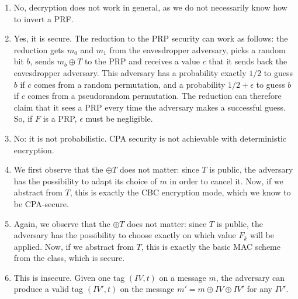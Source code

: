 \begin{solution}
\begin{enumerate}
\item No, decryption does not work in general, as we do not
	necessarily know how to invert a PRF.
	
\item 	Yes, it is secure.  The reduction to the PRP security can work as follows:
	the reduction gets $m_0$ and $m_1$ from the eavesdropper
	adversary, picks a random bit $b$, sends $m_b \oplus T$ to the
	PRP and receives a value $c$ that it sends back the eavesdropper
	adversary. This adversary has a probability exactly $1/2$ to
	guess $b$ if $c$ comes from a random permutation, and a
	probability $1/2 + \epsilon$ to guess $b$ if $c$ comes from a
	pseudorandom permutation. The reduction can therefore claim that
	it sees a PRP every time the adversary makes a successful
	guess. So, if $F$ is a PRP, $\epsilon$ must be negligible.

\item 	No: it is not probabilistic. CPA security is not achievable with deterministic encryption. 

\item We first observe that the $\oplus T$ does not matter:
since $T$ is public, the adversary has the possibility to adapt
its choice of $m$ in order to cancel it.  Now, if we abstract
from $T$, this is exactly the CBC encryption mode, which we know
to be CPA-secure.
\item Again, we observe that the $\oplus T$ does not matter: since
$T$ is public, the adversary has the possibility to choose exactly
on which value $F_k$ will be applied. Now, if we abstract from $T$,
this is exactly the basic MAC scheme from the class, which is secure.
\item This is insecure. Given one tag $(IV, t)$ on a message
$m$, the adversary can produce a valid tag $(IV', t)$ on the
message $m' = m \oplus IV \oplus IV'$ for any $IV'$.
	
\end{enumerate}
\end{solution}
